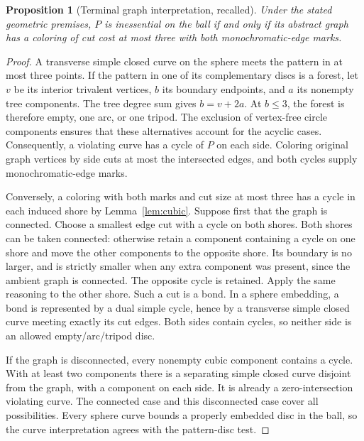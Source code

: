 \documentclass[11pt,letterpaper]{article}
\newtheorem{proposition}[theorem]{Proposition}
\theoremstyle{definition}
\theoremstyle{remark}\newtheorem{remark}[theorem]{Remark}
\begin{document}
\begin{proposition}[Terminal graph interpretation, recalled]\label{prop:ball}
Under the stated geometric premises, $P$ is inessential on the ball if and only if its abstract graph has a coloring of cut cost at most three with both monochromatic-edge marks.
\end{proposition}
\begin{proof}
A transverse simple closed curve on the sphere meets the pattern in at most three points. If the pattern in one of its complementary discs is a forest, let $v$ be its interior trivalent vertices, $b$ its boundary endpoints, and $a$ its nonempty tree components. The tree degree sum gives $b=v+2a$. At $b\le3$, the forest is therefore empty, one arc, or one tripod. The exclusion of vertex-free circle components ensures that these alternatives account for the acyclic cases. Consequently, a violating curve has a cycle of $P$ on each side. Coloring original graph vertices by side cuts at most the intersected edges, and both cycles supply monochromatic-edge marks.

Conversely, a coloring with both marks and cut size at most three has a cycle in each induced shore by Lemma~\ref{lem:cubic}. Suppose first that the graph is connected. Choose a smallest edge cut with a cycle on both shores. Both shores can be taken connected: otherwise retain a component containing a cycle on one shore and move the other components to the opposite shore. Its boundary is no larger, and is strictly smaller when any extra component was present, since the ambient graph is connected. The opposite cycle is retained. Apply the same reasoning to the other shore. Such a cut is a bond. In a sphere embedding, a bond is represented by a dual simple cycle, hence by a transverse simple closed curve meeting exactly its cut edges. Both sides contain cycles, so neither side is an allowed empty/arc/tripod disc.

If the graph is disconnected, every nonempty cubic component contains a cycle. With at least two components there is a separating simple closed curve disjoint from the graph, with a component on each side. It is already a zero-intersection violating curve. The connected case and this disconnected case cover all possibilities. Every sphere curve bounds a properly embedded disc in the ball, so the curve interpretation agrees with the pattern-disc test.
\end{proof}
\end{document}
